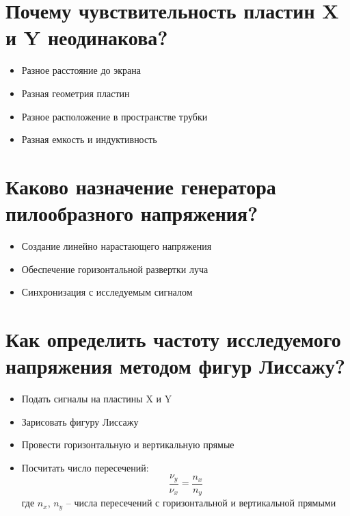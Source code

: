 \documentclass[14pt, a4paper, twoside]{extreport}
\begin{document}
\section{Почему чувствительность пластин X и Y неодинакова?}

\begin{itemize}
  \item Разное расстояние до экрана
  \item Разная геометрия пластин
  \item Разное расположение в пространстве трубки
  \item Разная емкость и индуктивность
\end{itemize}

\section{Каково назначение генератора пилообразного напряжения?}

\begin{itemize}
  \item Создание линейно нарастающего напряжения
  \item Обеспечение горизонтальной развертки луча
  \item Синхронизация с исследуемым сигналом
\end{itemize}

\section{Как определить частоту исследуемого напряжения методом фигур Лиссажу?}

\begin{itemize}
  \item Подать сигналы на пластины X и Y
  \item Зарисовать фигуру Лиссажу
  \item Провести горизонтальную и вертикальную прямые
  \item Посчитать число пересечений:
    \[
      \frac{\nu_y}{\nu_x} = \frac{n_x}{n_y}
    \]
    где $n_x$, $n_y$ -- числа пересечений с горизонтальной и вертикальной прямыми
\end{itemize}
\end{document}
